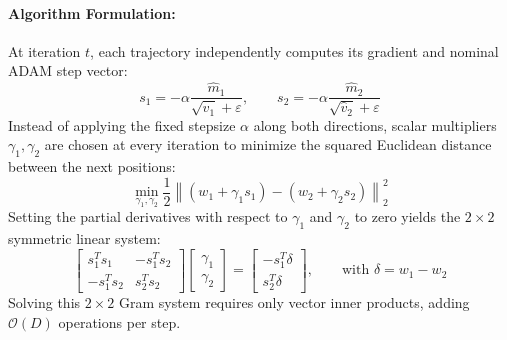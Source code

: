 \documentclass[11pt,a4paper]{article}
\newcommand{\added}[1]{#1}
\begin{document}
\added{\paragraph{Algorithm Formulation:}
At iteration $t$, each trajectory independently computes its gradient and nominal ADAM step vector:
\begin{equation}
s_1 = -\alpha \frac{\hat{m}_1}{\sqrt{\hat{v}_1} + \varepsilon}, \qquad s_2 = -\alpha \frac{\hat{m}_2}{\sqrt{\hat{v}_2} + \varepsilon}
\end{equation}
Instead of applying the fixed stepsize $\alpha$ along both directions, scalar multipliers $\gamma_1, \gamma_2$ are chosen at every iteration to minimize the squared Euclidean distance between the next positions:
\begin{equation}
\min_{\gamma_1, \gamma_2} \frac{1}{2} \left\| (w_1 + \gamma_1 s_1) - (w_2 + \gamma_2 s_2) \right\|_2^2
\end{equation}
Setting the partial derivatives with respect to $\gamma_1$ and $\gamma_2$ to zero yields the $2 \times 2$ symmetric linear system:
\begin{equation}
\begin{bmatrix}
s_1^T s_1 & -s_1^T s_2 \\
-s_1^T s_2 & s_2^T s_2
\end{bmatrix}
\begin{bmatrix}
\gamma_1 \\
\gamma_2
\end{bmatrix}
=
\begin{bmatrix}
-s_1^T \delta \\
s_2^T \delta
\end{bmatrix}, \qquad \text{with } \delta = w_1 - w_2
\end{equation}
Solving this $2 \times 2$ Gram system requires only vector inner products, adding $\mathcal{O}(D)$ operations per step.}
\end{document}
